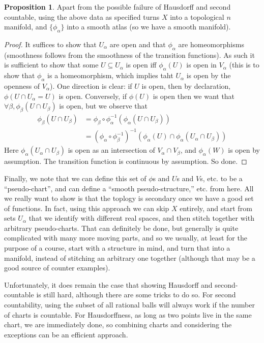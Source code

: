\documentclass{article}
\theoremstyle{definition}
\newtheorem{proposition}{Proposition}
\begin{document}
\begin{proposition}
  Apart from the possible failure of Hausdorff and second countable, using the
  above data as specified turns $X$ into a topological $n$ manifold, and
  $\{\phi_\alpha\}$ into a smooth atlas (so we have a smooth manifold).
\end{proposition}

\begin{proof}
  It suffices to show that $U_\alpha$ are open and that $\phi_\alpha$ are
  homeomorphisms (smoothness follows from the smoothness of the transition
  functions). As such it is sufficient to show that some $U \subseteq U_\alpha$
  is open iff $\phi_\alpha(U)$ is open in $V_\alpha$ (this is to show that
  $\phi_\alpha$ is a homeomorphism, which implies taht $U_\alpha$ is open by the
  openness of $V_\alpha$). One direction is clear: if $U$ is open, then by
  declaration, $\phi(U \cap U_\alpha = U)$ is open. Conversely, if $\phi(U)$ is
  open then we want that $\forall \beta, \phi_\beta(U \cap U_\beta)$ is open,
  but we observe that
  \begin{align*}
    \phi_\beta(U \cap U_\beta)
    &= \phi_\beta \circ \phi_\alpha^{-1} (\phi_\alpha(U \cap U_\beta)) \\
    &= (\phi_\alpha \circ \phi_\beta^{-1})^{-1}
      (\phi_\alpha(U) \cap \phi_\alpha(U_\alpha \cap U_\beta))
  \end{align*}
  Here $\phi_\alpha(U_\alpha \cap U_\beta)$ is open as an intersection of
  $V_\alpha \cap V_\beta$, and $\phi_\alpha(W)$ is open by assumption. The
  transition function is continuous by assumption. So done. 
\end{proof}

Finally, we note that we can define this set of $\phi$s and $U$s and $V$s, etc.
to be a ``pseudo-chart'', and can define a ``smooth pseudo-structure,'' etc.
from here. All we really want to show is that the toplogy is secondary once we
have a good set of functions. In fact, using this approach we can skip $X$
entirely, and start from sets $U_\alpha$ that we identify with different real
spaces, and then stitch together with arbitrary pseudo-charts. That can
definitely be done, but generally is quite complicated with many more moving
parts, and so we usually, at least for the purpose of a course, start with a
structure in mind, and turn that into a manifold, instead of stitching an
arbitrary one together (although that may be a good source of counter examples).

Unfortunately, it does remain the case that showing Hausdorff and
second-countable is still hard, although there are some tricks to do so. For
second countability, using the subset of all rational balls will always work if
the number of charts is countable. For Hausdorffness, as long as two points live
in the same chart, we are immediately done, so combining charts and considering
the exceptions can be an efficient approach.
\end{document}
